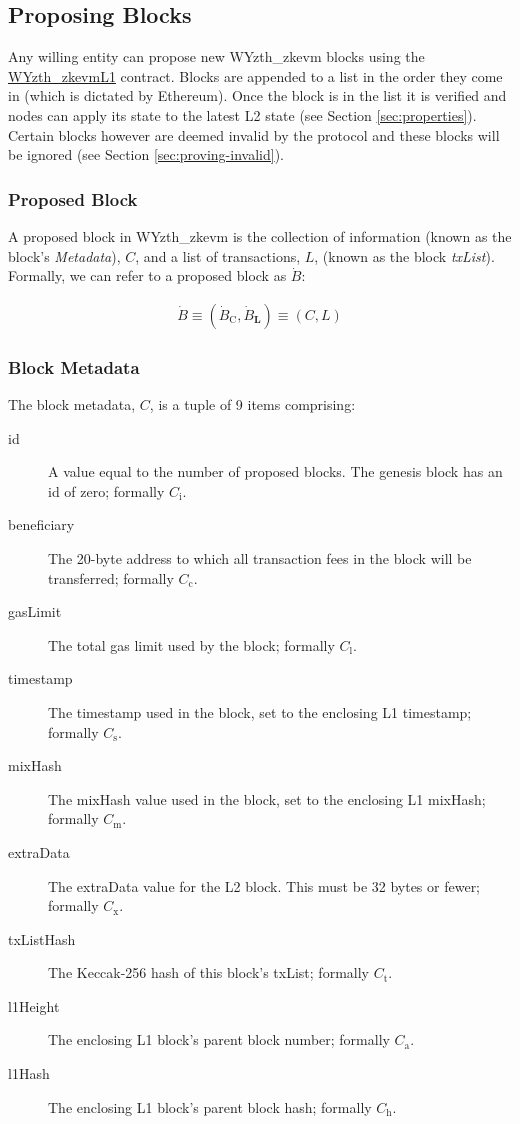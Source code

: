 \documentclass[9pt,oneside]{amsart}
\begin{document}
\begin{multicols}{2}
\subsection{Proposing Blocks}
Any willing entity can propose new WYzth_zkevm blocks using the {\underline{WYzth_zkevmL1}} contract. Blocks are appended to a list in the order they come in (which is dictated by Ethereum). Once the block is in the list it is verified and nodes can apply its state to the latest L2 state (see Section \ref{sec:properties}). Certain blocks however are deemed invalid by the protocol and these blocks will be ignored (see Section \ref{sec:proving-invalid}).

\subsubsection{Proposed Block} A proposed block in WYzth_zkevm is the collection of information (known as the block's \emph{Metadata}), $C$, and a list of transactions, $L$,  (known as the block \emph{txList}). Formally, we can refer to a proposed block as $\dot{B}$:

\begin{eqnarray}
\dot{B} \equiv (\dot{B}_{\mathrm{C}}, \dot{B}_{\mathbf{L}}) \equiv (C, L)
\end{eqnarray}

\subsubsection{Block Metadata}\label{metadata} The block metadata, $C$, is a tuple of 9 items comprising:

\begin{description}
\item[id] A value equal to the number of proposed blocks. The genesis block has an id of zero; formally $C_{\mathrm{i}}$.
\item[beneficiary] The 20-byte address to which all transaction fees in the block will be transferred; formally $C_{\mathrm{c}}$.
\item[gasLimit] The total gas limit used by the block; formally $C_{\mathrm{l}}$.
\item[timestamp] The timestamp used in the block, set to the enclosing L1 timestamp; formally $C_{\mathrm{s}}$.
\item[mixHash] The mixHash value used in the block, set to the enclosing L1 mixHash; formally $C_{\mathrm{m}}$.
\item[extraData] The extraData value for the L2 block. This must be 32 bytes or fewer; formally $C_{\mathrm{x}}$.
\item[txListHash] The Keccak-256 hash of this block's txList; formally $C_{\mathrm{t}}$. 
\item[l1Height] The enclosing L1 block's parent block number; formally $C_{\mathrm{a}}$.
\item[l1Hash] The enclosing L1 block's parent block hash; formally $C_{\mathrm{h}}$.
\end{description}


\end{multicols}
\end{document}
